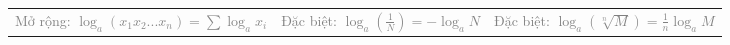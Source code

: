 \documentclass[11pt, aspectratio=169]{beamer}
\begin{document}
\begin{frame}[fragile]
\begin{center}
\begin{tabular}{c c c}
        \begin{minipage}{4.5cm}
            \vspace{0.2cm}
            \centering \scriptsize \textcolor{gray}{Mở rộng: $\log_a(x_1 x_2...x_n) = \sum \log_a x_i$}
        \end{minipage}
        &
        \begin{minipage}{4.5cm}
            \vspace{0.2cm}
            \centering \scriptsize \textcolor{gray}{Đặc biệt: $\log_a \left(\frac{1}{N}\right) = - \log_a N$}
        \end{minipage}
        &
        \begin{minipage}{4.5cm}
            \vspace{0.2cm}
            \centering \scriptsize \textcolor{gray}{Đặc biệt: $\log_a (\sqrt[n]{M}) = \frac{1}{n} \log_a M$}
        \end{minipage}
        
    \end{tabular}
    \end{center}

\end{frame}
\end{document}
